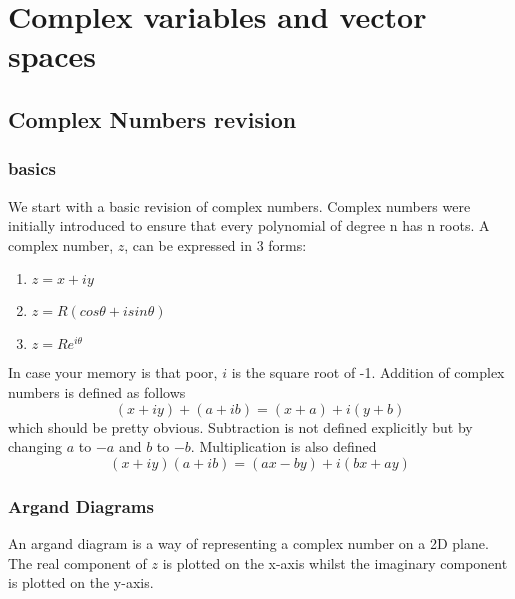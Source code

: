 \chapter{Complex variables and vector spaces}
\minitoc
\pagebreak
\section{Complex Numbers revision}
\subsection{basics}
We start with a basic revision of complex numbers. Complex numbers were initially introduced to ensure that every polynomial of degree n has n roots. A complex number, $z$, can be expressed in 3 forms:
\begin{enumerate}
	\item $z=x+iy$
	\item $z=R(cos\theta+isin\theta)$
	\item $z=Re^{i\theta}$
\end{enumerate}
In case your memory is that poor, $i$ is the square root of -1. Addition of complex numbers is defined as follows $$(x+iy) + (a+ib) = (x+a) + i(y+b) $$
which should be pretty obvious. Subtraction is not defined explicitly but by changing $a$ to $-a$ and $b$ to $-b$. Multiplication is also defined $$(x+iy)(a+ib) = (ax-by)+i(bx+ay)$$
\subsection{Argand Diagrams}
An argand diagram is a way of representing a complex number on a 2D plane. The real component of $z$ is plotted on the x-axis whilst the imaginary component is plotted on the y-axis. 



